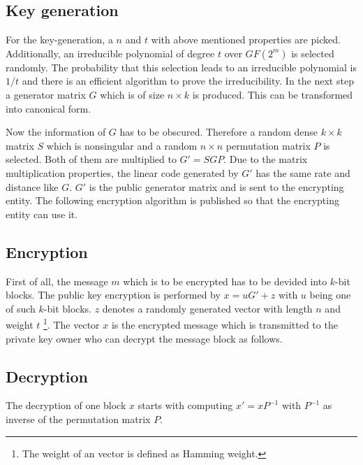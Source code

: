 \subsection*{Key generation}
For the key-generation, a $n$ and $t$ with above mentioned properties are picked. Additionally, an irreducible polynomial of degree $t$ over $GF(2^m)$  is selected randomly. The probability that this selection leads to an irreducible polynomial is $1/t$ and there is an efficient algorithm to prove the irreducibility\cite{berlekamp1968algebraic}.
In the next step a generator matrix $G$ which is of size $n \times k$ is produced. This can be transformed into canonical form. 

Now the information of $G$ has to be obscured. Therefore a random dense $k \times k$ matrix $S$ which is nonsingular and a random $n \times n$ permutation matrix $P$ is selected. Both of them are multiplied to $G' = SGP$. Due to the matrix multiplication properties, the linear code generated by $G'$ has the same rate and distance like $G$. $G'$ is the public generator matrix and is sent to the encrypting entity. 
\newline
\newline
The following encryption algorithm is published so that the encrypting entity can use it. 

\subsection*{Encryption}
First of all, the message $m$ which is to be encrypted has to be devided into $k$-bit blocks. The public key encryption is performed by $x = uG' + z$ with $u$ being one of such $k$-bit blocks. $z$ denotes a randomly generated vector with length $n$ and weight $t$ \footnote{The weight of an vector is defined as Hamming weight.}.
\newline
\newline
The vector $x$ is the encrypted message which is transmitted to the private key owner who can decrypt the message block as follows. 

\subsection*{Decryption}
The decryption of one block $x$ starts with computing $x' = xP^{-1}$ with $P^{-1}$ as inverse of the permutation matrix $P$. 

